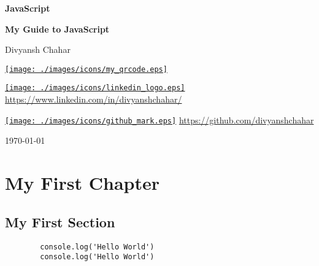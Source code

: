 \documentclass[twoside,12pt]{report}  %
\begin{document}
	\begin{titlepage}
		\begin{center}
			{\LARGE \textbf{JavaScript}}\\
			
			\hrulefill
			
			\textbf{My Guide to JavaScript} 
			
			\null
			
			Divyansh Chahar
			
			\vfill
			
			\href{https://www.linkedin.com/in/divyanshchahar/}{\texttt{[image: ./images/icons/my\_qrcode.eps]}}
			
			\null
			
			\href{https://www.linkedin.com/in/divyanshchahar/}{\texttt{[image: ./images/icons/linkedin\_logo.eps]}}
			\href{https://www.linkedin.com/in/divyanshchahar/}{https://www.linkedin.com/in/divyanshchahar/}
			
			\null
			
			\href{https://www.linkedin.com/in/divyanshchahar/}{\texttt{[image: ./images/icons/github\_mark.eps]}}
			\href{https://github.com/divyanshchahar}{https://github.com/divyanshchahar}
			
			\vfill
			
			\today
			
		\end{center}
	\end{titlepage}
	
	
	\restoregeometry
	
	\chapter{My First Chapter}
	
	\section{My First Section}

	
	\begin{verbatim}
		console.log('Hello World')
		console.log('Hello World')
	\end{verbatim}
		
	
	
	
	
\end{document}
